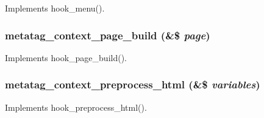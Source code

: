 \label{metatag__context_8module_a23526ae514a5ac48cb005f3953b5198e}
Implements hook\_\-menu(). \hypertarget{metatag__context_8module_ae9aec377175590dfb274950b2efcca59}{
\subsubsection[{metatag\_\-context\_\-page\_\-build}]{\setlength{\rightskip}{0pt plus 5cm}metatag\_\-context\_\-page\_\-build (\&\$ {\em page})}}
\label{metatag__context_8module_ae9aec377175590dfb274950b2efcca59}
Implements hook\_\-page\_\-build(). \hypertarget{metatag__context_8module_a4cd862515789578ba6c88c8df512f0d6}{
\subsubsection[{metatag\_\-context\_\-preprocess\_\-html}]{\setlength{\rightskip}{0pt plus 5cm}metatag\_\-context\_\-preprocess\_\-html (\&\$ {\em variables})}}
\label{metatag__context_8module_a4cd862515789578ba6c88c8df512f0d6}
Implements hook\_\-preprocess\_\-html(). 
